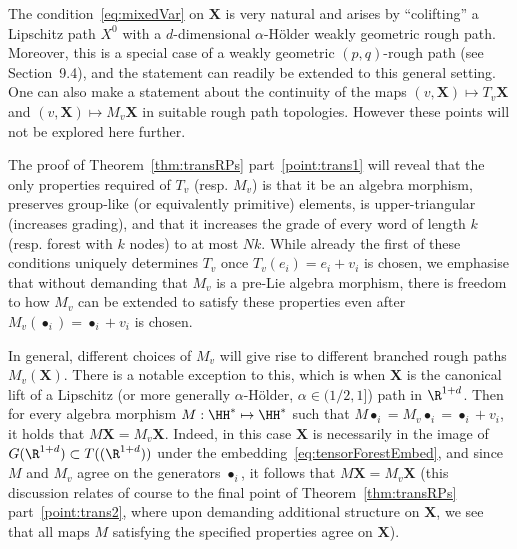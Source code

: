 \documentclass{article}
\begin{document}
\begin{remark}\label{remark:colifting}
The condition~\eqref{eq:mixedVar} on $\mathbf{X}$ is very natural and arises by ``colifting'' a Lipschitz path $X^0$ with a $d$-dimensional $\alpha$-H{\"o}lder weakly geometric rough path. Moreover, this is a special case of a weakly geometric $(p,q)$-rough path (see~\cite{FrizVictoir10} Section~9.4), and the statement can readily be extended to this general setting.
One can also make a statement about the continuity of the maps $(v,\mathbf{X}) \mapsto T_v\mathbf{X}$ and $(v,\mathbf{X}) \mapsto M_v\mathbf{X}$ in suitable rough path topologies. However these points will not be explored here further.
\end{remark}

\begin{remark}\label{remark:algMorphs}
The proof of Theorem~\ref{thm:transRPs} part~\ref{point:trans1} will reveal that the only properties required of $T_v$ (resp. $M_v$) is that it be an algebra morphism, preserves group-like (or equivalently primitive) elements, is upper-triangular (increases grading), and that it increases the grade of every word of length $k$ (resp. forest with $k$ nodes) to at most $Nk$. While already the first of these conditions uniquely determines $T_v$ once $T_v (e_i) = e_i + v_i$ is chosen, we emphasise that without demanding that $M_v$ is a pre-Lie algebra morphism, there is freedom to how $M_v$ can be extended to satisfy these properties even after $M_v(\bullet_i) = \bullet_i + v_i$ is chosen.

In general, different choices of $M_v$ will give rise to different branched rough paths $M_v(\mathbf{X})$. There is a notable exception to this, which is when $\mathbf{X}$ is the canonical lift of a Lipschitz (or more generally $\alpha$-H{\"o}lder, $\alpha \in (1/2,1]$) path in $\R^{1+d}$. Then for every algebra morphism $M : \HH^* \mapsto \HH^*$ such that $M \bullet_i = M_v \bullet_i = \bullet_i + v_i$, it holds that $M \mathbf{X} = M_v \mathbf{X}$. Indeed, in this case $\mathbf{X}$ is necessarily in the image of $G(\R^{1+d}) \subset T((\R^{1+d}))$ under the embedding~\eqref{eq:tensorForestEmbed}, and since $M$ and $M_v$ agree on the generators $\bullet_i$, it follows that $M\mathbf{X} = M_v \mathbf{X}$ (this discussion relates of course to the final point of Theorem~\ref{thm:transRPs} part~\ref{point:trans2}, where upon demanding additional structure on $\mathbf{X}$, we see that all maps $M$ satisfying the specified properties agree on $\mathbf{X}$).
\end{remark}
\end{document}
